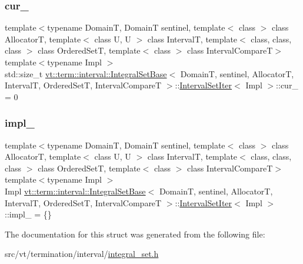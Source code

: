 \subsubsection{\texorpdfstring{cur\+\_\+}{cur\_}}
{\footnotesize\ttfamily template$<$typename DomainT, DomainT sentinel, template$<$ class $>$ class AllocatorT, template$<$ class U, U $>$ class IntervalT, template$<$ class, class, class $>$ class Ordered\+SetT, template$<$ class $>$ class Interval\+CompareT$>$ \\
template$<$typename Impl $>$ \\
std\+::size\+\_\+t \hyperlink{structvt_1_1term_1_1interval_1_1_integral_set_base}{vt\+::term\+::interval\+::\+Integral\+Set\+Base}$<$ DomainT, sentinel, AllocatorT, IntervalT, Ordered\+SetT, Interval\+CompareT $>$\+::\hyperlink{structvt_1_1term_1_1interval_1_1_integral_set_base_1_1_interval_set_iter}{Interval\+Set\+Iter}$<$ Impl $>$\+::cur\+\_\+ = 0\hspace{0.3cm}{\ttfamily [private]}}

\mbox{\label{structvt_1_1term_1_1interval_1_1_integral_set_base_1_1_interval_set_iter_a4180d4e5b3e4dcfef87b99d2e2ca760c}} 
\subsubsection{\texorpdfstring{impl\+\_\+}{impl\_}}
{\footnotesize\ttfamily template$<$typename DomainT, DomainT sentinel, template$<$ class $>$ class AllocatorT, template$<$ class U, U $>$ class IntervalT, template$<$ class, class, class $>$ class Ordered\+SetT, template$<$ class $>$ class Interval\+CompareT$>$ \\
template$<$typename Impl $>$ \\
Impl \hyperlink{structvt_1_1term_1_1interval_1_1_integral_set_base}{vt\+::term\+::interval\+::\+Integral\+Set\+Base}$<$ DomainT, sentinel, AllocatorT, IntervalT, Ordered\+SetT, Interval\+CompareT $>$\+::\hyperlink{structvt_1_1term_1_1interval_1_1_integral_set_base_1_1_interval_set_iter}{Interval\+Set\+Iter}$<$ Impl $>$\+::impl\+\_\+ = \{\}\hspace{0.3cm}{\ttfamily [private]}}



The documentation for this struct was generated from the following file\+:\begin{DoxyCompactItemize}
\item 
src/vt/termination/interval/\hyperlink{integral__set_8h}{integral\+\_\+set.\+h}\end{DoxyCompactItemize}
